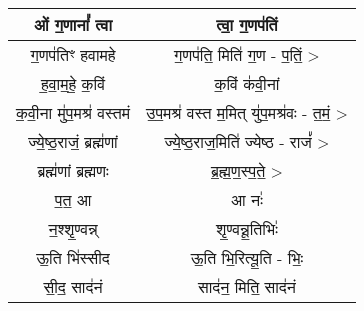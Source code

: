 \section{}
\subsection{}
{\centering
\begin{longtable}{|c|c|}
\hline
ओं ग॒णानां᳚ त्वा         & त्वा॒ ग॒णप॑तिं\\
\hline
ग॒णप॑तिꣳ हवामहे        & ग॒णप॑ति॒ मिति॑ ग॒ण - प॒तिं॒ >\\
\hline
ह॒वा॒म॒हे॒ क॒विं           & क॒विं क॑वी॒नां\\
\hline
क॒वी॒ना मु॑प॒मश्र॑ वस्तमं      & उ॒प॒मश्र॑ वस्त म॒मित् यु॑प॒मश्र॑वः - त॒मं॒ >\\
\hline
ज्ये॒ष्ठ॒राजं॒ ब्रह्म॑णां      & ज्ये॒ष्ठ॒राज॒मिति॑ ज्येष्ठ - राजं᳚ >\\
\hline
ब्रह्म॑णां ब्रह्मणः       & ब्र॒ह्म॒ण॒स्प॒ते॒ >\\
\hline
प॒त॒ आ                & आ नः॑\\
\hline
न॒श्शृ॒ण्वन्न्             & शृ॒ण्वन्नू॒तिभिः॑\\
\hline
ऊ॒ति भि॑स्सीद           & ऊ॒ति भि॒रित्यू॒ति - भिः॒\\
\hline
सी॒द॒ साद॑नं            & साद॑न॒ मिति॒ साद॑नं\\
\hline
\end{longtable}
}
